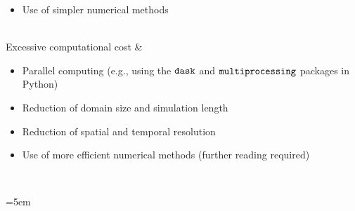 \documentclass[titlepage]{article}
\begin{document}
\begin{table}[ht]
\begin{tabular}
\begin{itemize}[parsep=0pt,itemsep=3pt,topsep=0pt,leftmargin=14pt]
            \item Use of simpler numerical methods
        \end{itemize} \\
        Excessive computational cost & %
        \vspace{-\topsep}
        \begin{itemize}[parsep=0pt,itemsep=3pt,topsep=0pt,leftmargin=14pt]
            \item Parallel computing (e.g., using the $\verb|dask|$ and
                $\verb|multiprocessing|$ packages in Python)
            \item Reduction of domain size and simulation length
            \item Reduction of spatial and temporal resolution
            \item Use of more efficient numerical methods (further reading
                required)
        \end{itemize} \\
        \bottomrule
    \end{tabular}
    \caption{
        Potential pitfalls for the project and proposed solutions.
    }
    \label{tab:pitfalls}
\end{table}

\emergencystretch=5em
\printbibliography
\end{document}
